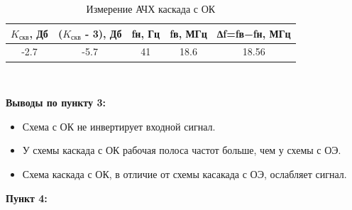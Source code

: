 \documentclass[a4paper,14pt]{extarticle}
\begin{document}
    \begin{table}[ht]
        \begin{center}
            \caption{Измерение АЧХ каскада с ОК}
            \begin{tabular}{ |c|c|c|c|c| }
                \hline
                $K_{\text{скв}}$, Дб & ($K_{\text{скв}}$ - 3), Дб&fн, Гц & fв, МГц & ∆f=fв−fн, МГц \\
                \hline 
                -2.7 & -5.7 & 41 & 18.6 & 18.56\\
                \hline
            \end{tabular}\\
        \end{center}
    \end{table}
    \textbf{Выводы по пункту 3:}
    \vspace{-6ex}
    \begin{singlespace}
        \begin{itemize}
            \item Схема с ОК не инвертирует входной сигнал.
            \item У схемы каскада с ОК рабочая полоса частот больше, чем у схемы с ОЭ.
            \item Схема каскада с ОК, в отличие от схемы касакада с ОЭ, ослабляет сигнал. 
        \end{itemize}
    \end{singlespace}


    \newpage
    \textbf{Пункт 4:}
\end{document}
